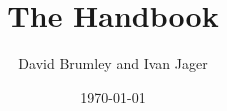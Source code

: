 \documentclass[11pt,twoside]{book}
\newcommand{\doctitle}{The \bap Handbook}
\begin{document}
\title{\doctitle}
\author{David Brumley and Ivan Jager}
\date{\today}
 
\maketitle
\thispagestyle{plain}

\frontmatter

%
\tableofcontents
\listoffigures
\listoftables

\mainmatter












%








\end{document}
